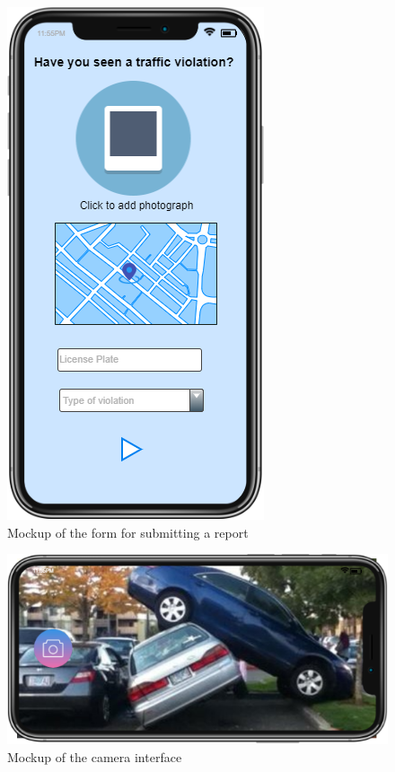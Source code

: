 	\newpage
	\begin{figure}[h!]
		\centering
		\includegraphics[scale=0.90]{Images/Report_Mockup}
		\caption{Mockup of the form for submitting a report}
	\end{figure}
	\newpage
	\begin{figure}[h!]
		\centering
		\includegraphics[scale=0.55]{Images/Camera_Mockup}
		\caption{Mockup of the camera interface}
	\end{figure}
